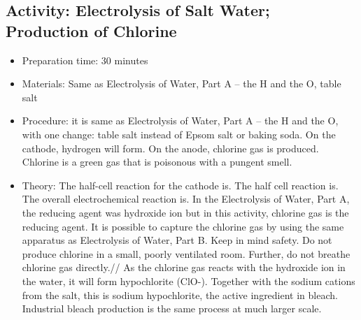 \begin{itemize}
{\begin{itemize}
\subsection{Activity: Electrolysis of Salt Water; Production of Chlorine}
\begin{itemize}
\item{Preparation time: 30 minutes}
\item{Materials: Same as Electrolysis of Water, Part A – the H and the O, table salt  }
\item{Procedure:  it is same as Electrolysis of Water, Part A – the H and the O, with one change: table salt instead of Epsom salt or baking soda. On the cathode, hydrogen will form. On the anode, chlorine gas is produced. Chlorine is a green gas that is poisonous with a pungent smell.}
\item{Theory: The half-cell reaction for the cathode is. The half cell reaction is. The overall electrochemical reaction is. In the Electrolysis of Water, Part A, the reducing agent was hydroxide ion but in this activity, chlorine gas is the reducing agent. It is possible to capture the chlorine gas by using the same apparatus as Electrolysis of Water, Part B. Keep in mind safety. Do not produce chlorine in a small, poorly ventilated room. Further, do not breathe chlorine gas directly.//
As the chlorine gas reacts with the hydroxide ion in the water, it will form hypochlorite (ClO-). Together with the sodium cations from the salt, this is sodium hypochlorite, the active ingredient in bleach. Industrial bleach production is the same process at much larger scale.}
\end{itemize}


\end{itemize}}
\end{itemize}
